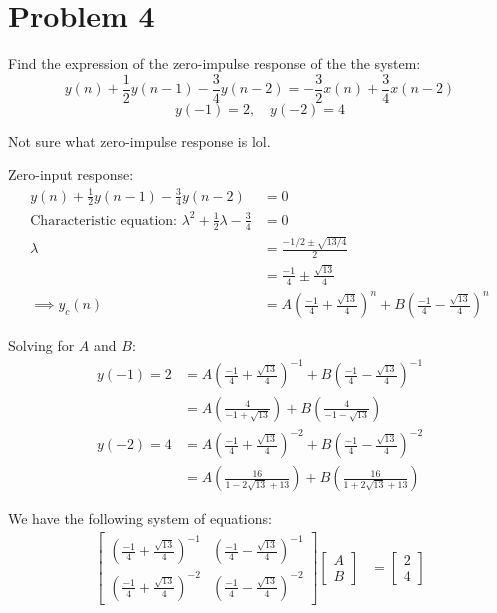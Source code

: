 \documentclass{article}
\begin{document}
\section{Problem 4}
Find the expression of the zero-impulse response of the the system:
\[
    y(n) + \frac{1}{2}y(n-1)-\frac{3}{4}y(n-2) = -\frac{3}{2}x(n) + \frac{3}{4}x(n-2)
\]
\[
    y(-1) = 2, \quad y(-2) = 4
\]

Not sure what zero-impulse response is lol.

Zero-input response:
\begin{align*}
    y(n) + \frac{1}{2}y(n-1)-\frac{3}{4}y(n-2) &= 0 \\
    \text{Characteristic equation: } \lambda^2 + \frac{1}{2}\lambda - \frac{3}{4} &= 0 \\
    \lambda &= \frac{-1/2 \pm \sqrt{13/4}}{2} \\
    &= \frac{-1}{4} \pm \frac{\sqrt{13}}{4} \\
    \implies y_c(n) &= A\left(\frac{-1}{4} + \frac{\sqrt{13}}{4}\right)^n + B\left(\frac{-1}{4} - \frac{\sqrt{13}}{4}\right)^n
\end{align*}

Solving for $A$ and $B$:
\begin{align*}
    y(-1) = 2 &= A\left(\frac{-1}{4} + \frac{\sqrt{13}}{4}\right)^{-1} + B\left(\frac{-1}{4} - \frac{\sqrt{13}}{4}\right)^{-1} \\
    &= A\left(\frac{4}{-1 + \sqrt{13}}\right) + B\left(\frac{4}{-1 - \sqrt{13}}\right) \\
    y(-2) = 4 &= A\left(\frac{-1}{4} + \frac{\sqrt{13}}{4}\right)^{-2} + B\left(\frac{-1}{4} - \frac{\sqrt{13}}{4}\right)^{-2} \\
    &= A\left(\frac{16}{1 - 2\sqrt{13} + 13}\right) + B\left(\frac{16}{1 + 2\sqrt{13} + 13}\right)
\end{align*}

We have the following system of equations:
\begin{align*}
    \begin{bmatrix}
        \left(\frac{-1}{4} + \frac{\sqrt{13}}{4}\right)^{-1} & \left(\frac{-1}{4} - \frac{\sqrt{13}}{4}\right)^{-1} \\
        \left(\frac{-1}{4} + \frac{\sqrt{13}}{4}\right)^{-2} & \left(\frac{-1}{4} - \frac{\sqrt{13}}{4}\right)^{-2}
    \end{bmatrix} \begin{bmatrix}
        A \\ B
    \end{bmatrix} &= \begin{bmatrix}
        2 \\ 4
    \end{bmatrix}
\end{align*}
\end{document}
